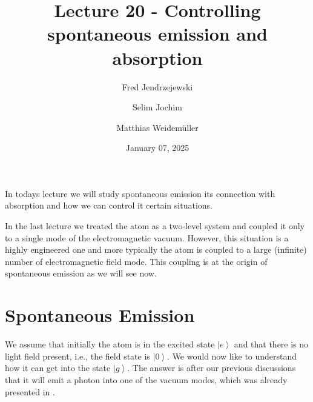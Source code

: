 \documentclass[10pt]{article}
\let\cite\citep
\renewenvironment{abstract}
  {{\bfseries\noindent{\abstractname}\par\nobreak}\footnotesize}
  {\bigskip}
\providecommand\citep{\cite}
\newcommand{\ket}[1]{\ensuremath{\left|#1\right\rangle}}
\begin{document}
\title{Lecture 20 - Controlling spontaneous emission and absorption}



\author[1]{Fred Jendrzejewski}%
\author[2]{Selim Jochim}%
\author[2]{Matthias Weidemüller}%
%
%


\vspace{-1em}



  
  \date{January 07, 2025}


\begingroup
\let\center\flushleft
\let\endcenter\endflushleft
\maketitle
\endgroup





\begin{abstract}
In todays lecture we will study spontaneous emission its connection with absorption and how we can control it certain situations.%
\end{abstract}%



\sloppy


In the last lecture \cite{states} we treated the atom as a two-level system and coupled it only to a single mode of the electromagnetic vacuum. However, this situation is a highly engineered one and more typically the atom is coupled to a large (infinite) number of electromagnetic field mode. This coupling is at the origin of spontaneous emission as we will see now.

\section{Spontaneous Emission}

We assume that initially the atom is in the excited state $\ket{e}$ and that there is no light field present, i.e., the field state is $\ket{0}$. We would now like to understand how it can get into the state $\ket{g}$. The answer is after our previous discussions that it will emit a photon into one of the vacuum modes, which was already presented in \cite{field}. 
\end{document}
